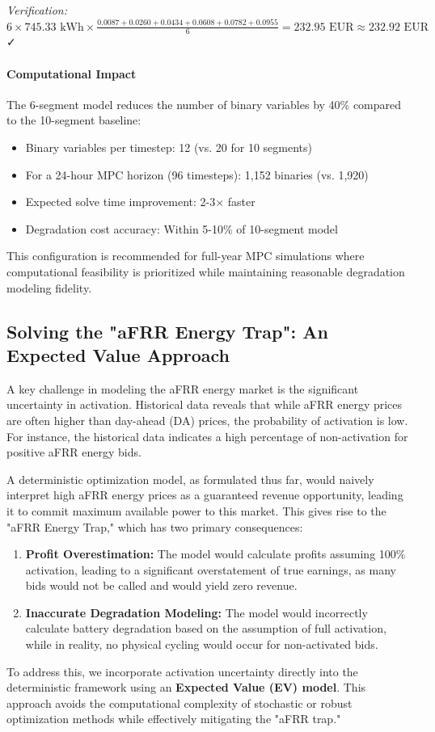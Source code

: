 \documentclass[11pt, a4paper]{article}
\begin{document}
\textit{Verification:} $6 \times 745.33 \text{ kWh} \times \frac{0.0087+0.0260+0.0434+0.0608+0.0782+0.0955}{6} = 232.95 \text{ EUR} \approx 232.92 \text{ EUR}$ ✓

\paragraph{Computational Impact}
The 6-segment model reduces the number of binary variables by 40\% compared to the 10-segment baseline:
\begin{itemize}
    \item Binary variables per timestep: 12 (vs. 20 for 10 segments)
    \item For a 24-hour MPC horizon (96 timesteps): 1,152 binaries (vs. 1,920)
    \item Expected solve time improvement: 2-3× faster
    \item Degradation cost accuracy: Within 5-10\% of 10-segment model
\end{itemize}

This configuration is recommended for full-year MPC simulations where computational feasibility is prioritized while maintaining reasonable degradation modeling fidelity.


\subsection{Solving the "aFRR Energy Trap": An Expected Value Approach}
\label{sec:afrr_trap_solution}
A key challenge in modeling the aFRR energy market is the significant uncertainty in activation. Historical data reveals that while aFRR energy prices are often higher than day-ahead (DA) prices, the probability of activation is low. For instance, the historical data indicates a high percentage of non-activation for positive aFRR energy bids.

A deterministic optimization model, as formulated thus far, would naively interpret high aFRR energy prices as a guaranteed revenue opportunity, leading it to commit maximum available power to this market. This gives rise to the "aFRR Energy Trap," which has two primary consequences:
\begin{enumerate}
    \item \textbf{Profit Overestimation:} The model would calculate profits assuming 100\% activation, leading to a significant overstatement of true earnings, as many bids would not be called and would yield zero revenue.
    \item \textbf{Inaccurate Degradation Modeling:} The model would incorrectly calculate battery degradation based on the assumption of full activation, while in reality, no physical cycling would occur for non-activated bids.
\end{enumerate}
To address this, we incorporate activation uncertainty directly into the deterministic framework using an \textbf{Expected Value (EV) model}. This approach avoids the computational complexity of stochastic or robust optimization methods while effectively mitigating the "aFRR trap."
\end{document}

